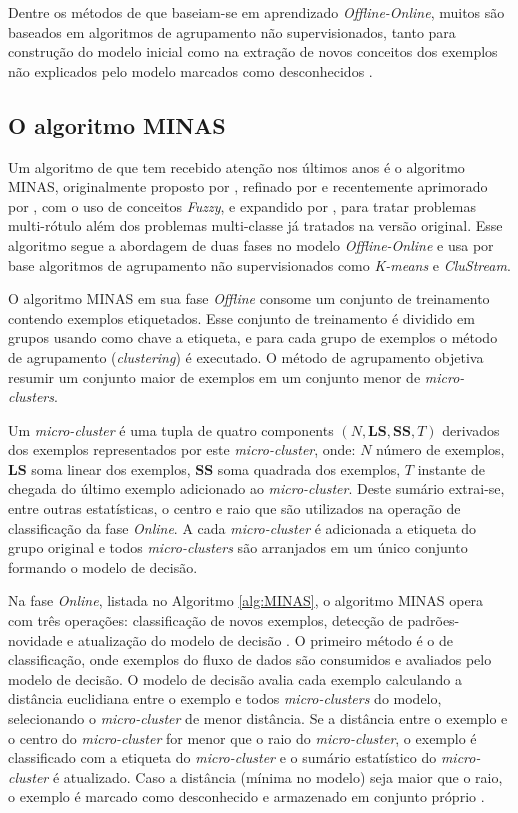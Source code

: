 Dentre os métodos de \nd que baseiam-se em aprendizado \emph{Offline-Online},
muitos são baseados em algoritmos de agrupamento não supervisionados, tanto
para construção do modelo inicial como na extração de novos conceitos dos
exemplos não explicados pelo modelo marcados como desconhecidos
\cite{Spinosa2009ollinda,Masud2010ECSMiner,Faria2013}.

\subsection{O algoritmo MINAS}\label{sec:minas-og}

Um algoritmo de \nd que tem recebido atenção nos últimos anos é o algoritmo
MINAS, originalmente proposto por , refinado por
 e recentemente aprimorado por
, com o uso de conceitos \emph{Fuzzy}, e expandido por
, para tratar problemas multi-rótulo além dos problemas
multi-classe já tratados na versão original.
Esse algoritmo segue a abordagem de duas fases no modelo \emph{Offline-Online} e
usa por base algoritmos de agrupamento não supervisionados como \emph{K-means} e
\emph{CluStream}.

\newcommand{\mcluster}{\emph{micro-cluster}\xspace}
\newcommand{\mclusters}{\emph{micro-clusters}\xspace}

O algoritmo MINAS em sua fase \emph{Offline} consome um conjunto de treinamento
contendo exemplos etiquetados.
Esse conjunto de treinamento é dividido em grupos usando como chave a etiqueta,
e para cada grupo de exemplos o método de agrupamento (\emph{clustering}) é executado.
O método de agrupamento objetiva resumir um conjunto maior de exemplos em
um conjunto menor de \mclusters.

Um \mcluster é uma tupla de quatro components $(N, \mathbf{LS}, \mathbf{SS}, T)$
derivados dos exemplos representados por este \mcluster, onde:
$N$ número de exemplos,
$\mathbf{LS}$ soma linear dos exemplos,
$\mathbf{SS}$ soma quadrada dos exemplos,
$T$ instante de chegada do último exemplo adicionado ao \mcluster.
Deste sumário extrai-se, entre outras estatísticas, o centro e raio que são
utilizados na operação de classificação da fase \emph{Online}.
A cada \mcluster é adicionada a etiqueta do grupo original e todos \mclusters
são arranjados em um único conjunto formando o modelo de decisão.

Na fase \emph{Online}, listada no Algoritmo \ref{alg:MINAS}, o algoritmo MINAS
opera com três operações: classificação de novos exemplos, detecção de 
padrões-novidade e atualização do modelo de decisão \cite{Faria2015minas}.
O primeiro método é o de classificação, onde exemplos do fluxo de dados
são consumidos e avaliados pelo modelo de decisão.
O modelo de decisão avalia cada exemplo calculando a distância euclidiana
entre o exemplo e todos \mclusters do modelo, selecionando o
\mcluster de menor distância.
Se a distância entre o exemplo e o centro do \mcluster for menor que
o raio do \mcluster, o exemplo é classificado com a etiqueta do \mcluster
e o sumário estatístico do \mcluster é atualizado.
Caso a distância (mínima no modelo) seja maior que o raio,
o exemplo é marcado como desconhecido e armazenado
em conjunto próprio \cite{Faria2015minas}.

